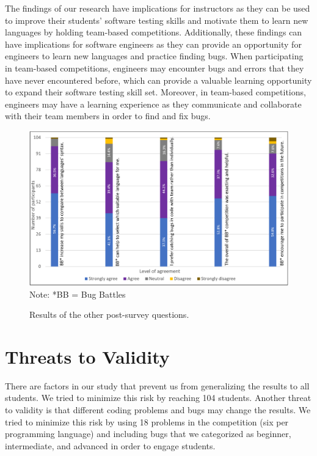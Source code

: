\documentclass{article}
\begin{document}
The findings of our research have implications for instructors as they can be used to improve their students' software testing skills and motivate them to learn new languages by holding team-based competitions. Additionally, these findings can have implications for software engineers as they can provide an opportunity for engineers to learn new languages and practice finding bugs. When participating in team-based competitions, engineers may encounter bugs and errors that they have never encountered before, which can provide a valuable learning opportunity to expand their software testing skill set. Moreover, in team-based competitions, engineers may have a learning experience as they communicate and collaborate with their team members in order to find and fix bugs.

\begin{figure}[htbp]
{\includegraphics[width=\textwidth]{241_4.png}}
\footnotesize{ Note: *BB = Bug Battles}
\caption{Results of the other post-survey questions.} \label{fig:q.others}

\end{figure} 

\section{Threats to Validity} \label{section:threats} 
There are factors in our study that prevent us from generalizing the results to all students. We tried to minimize this risk by reaching 104 students. Another threat to validity is that different coding problems and bugs may change the results. We tried to minimize this risk by using 18 problems in the competition (six per programming language) and including bugs that we categorized as beginner, intermediate, and advanced in order to engage students. 
\end{document}
